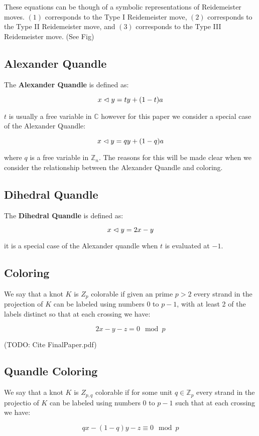 \documentclass[paper.tex]{subfiles}
\begin{document}
These equations can be though of a symbolic representations of Reidemeister moves. $(1)$ corresponds to the Type I Reidemeister move, $(2)$ corresponds to the Type II Reidemeister move, and $(3)$ corresponds to the Type III Reidemeister move. (See Fig)

\subsection{Alexander Quandle}

The \textbf{Alexander Quandle} is defined as:

$$ x \vartriangleleft y = ty + (1 - t)a $$

$t$ is usually a free variable in $\mathbb{C}$ however for this paper we consider a special case of the Alexander Quandle:

$$ x \vartriangleleft y = qy + (1 - q)a $$

where $q$ is a free variable in $\mathbb{Z}_n$. The reasons for this will be made clear when we consider the relationship between the Alexander Quandle and coloring.

\subsection{Dihedral Quandle}
The \textbf{Dihedral Quandle} is defined as:

$$x\vartriangleleft y = 2x - y$$

it is a special case of the Alexander quandle when $t$ is evaluated at $-1$.

\subsection{Coloring}

We say that a knot $K$ is $Z_p$ colorable if given an prime $p > 2$ every strand in the projection of $K$ can be labeled using numbers $0$ to $p-1$, with at least 2 of the labels distinct so that at each crossing we have:

$$ 2x - y - z = 0 \mod p $$

(TODO: Cite FinalPaper.pdf)

\subsection{Quandle Coloring}

We say that a knot $K$ is $Z_{p,q}$ colorable if for some unit $q \in \mathbb{Z}_p$ every strand in the projectio of $K$ can be labeled using numbers $0$ to $p-1$ such that at each crossing we have:

$$qx - (1-q)y - z \equiv 0 \mod p $$ 
\end{document}
